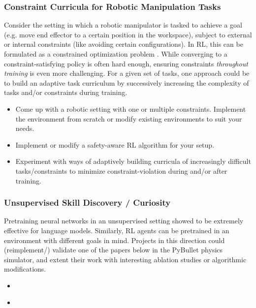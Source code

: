 \documentclass[a4paper]{article}
\begin{document}
\subsubsection{Constraint Curricula for Robotic Manipulation Tasks}
Consider the setting in which a robotic manipulator is tasked to achieve a goal (e.g. move end effector to a certain position in the workspace), subject to external or internal constraints (like avoiding certain configurations). In RL, this can be formulated as a constrained optimization problem \cite{Achiam2019BenchmarkingSE}. While converging to a constraint-satisfying policy is often hard enough, ensuring constraints \textit{throughout training} is even more challenging. For a given set of tasks, one approach could be to build an adaptive task curriculum by successively increasing the complexity of tasks and/or constraints during training.
\begin{itemize}
  \item Come up with a robotic setting with one or multiple constraints. Implement the environment from scratch or modify existing environments to suit your needs.
  \item Implement or modify a safety-aware RL algorithm for your setup.
  \item Experiment with ways of adaptively building curricula of increasingly difficult tasks/constraints to minimize constraint-violation during and/or after training.
\end{itemize}

\subsubsection{Unsupervised Skill Discovery / Curiosity}
Pretraining neural networks in an unsupervised setting showed to be extremely effective for language models. Similarly, RL agents can be pretrained in an environment with different goals in mind. Projects in this direction could (reimplement/) validate one of the papers below in the PyBullet physics simulator, and extent their work with interesting ablation studies or algorithmic modifications.
\begin{itemize}
  \item \cite{Plan2Explore2020}
  \item \cite{DADS2020}
\end{itemize}



\end{document}
